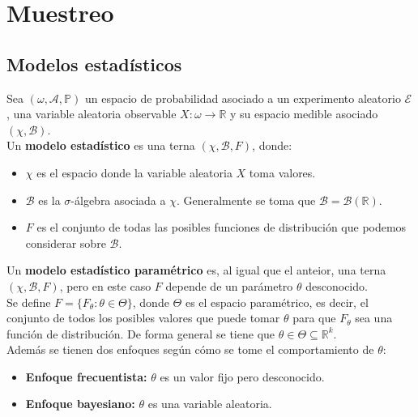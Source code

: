 \section{Muestreo}

\subsection{Modelos estadísticos}

\label{Modelo estidístico}
\begin{definición}
Sea $(\omega, \mathcal{A}, \mathbb{P})$ un espacio de probabilidad asociado a un experimento aleatorio $\mathcal{E}$, una variable aleatoria observable $X: \omega \to \mathbb{R}$ y su espacio medible asociado $(\chi, \mathcal{B})$.
\\Un \textbf{modelo estadístico} es una terna $(\chi, \mathcal{B}, F)$, donde:
\vspace{-\topsep}
\begin{itemize}
	\item $\chi$ es el espacio donde la variable aleatoria $X$ toma valores.
	\item $\mathcal{B}$ es la $\sigma$-álgebra asociada a $\chi$. Generalmente se toma que $\mathcal{B} = \mathcal{B}(\mathbb{R})$.
	\item $F$ es el conjunto de todas las posibles funciones de distribución que podemos considerar sobre $\mathcal{B}$.
\end{itemize}
\end{definición}

\begin{definición}
Un \textbf{modelo estadístico paramétrico} es, al igual que el anteior, una terna $(\chi, \mathcal{B}, F)$, pero en este caso $F$ depende de un parámetro $\theta$ desconocido. \\
Se define $F = \{F_{\theta} : \theta \in \Theta\}$, donde $\Theta$ es el espacio paramétrico, es decir, el conjunto de todos los posibles valores que puede tomar $\theta$ para que $F_\theta$ sea una función de distribución.
De forma general se tiene que $\theta \in \Theta \subseteq \mathbb{R}^{k}$. \\
Además se tienen dos enfoques según cómo se tome el comportamiento de $\theta$:
\vspace{-\topsep}
\begin{itemize}
	\item \textbf{Enfoque frecuentista:} $\theta$ es un valor fijo pero desconocido.
	\item \textbf{Enfoque bayesiano:} $\theta$ es una variable aleatoria.
\end{itemize}
\end{definición}

